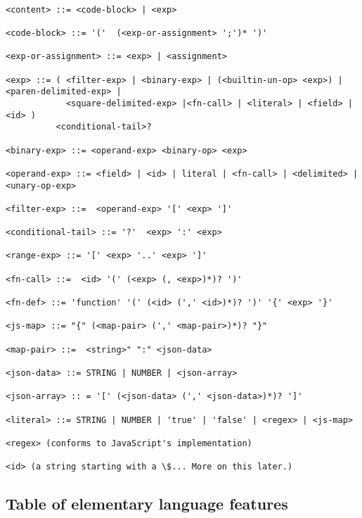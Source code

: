 \documentclass[9pt,letterpaper]{article}
\begin{document}
\begin{Verbatim}[fontsize=\footnotesize]

<content> ::= <code-block> | <exp>

<code-block> ::= '('  (<exp-or-assignment> ';')* ')'

<exp-or-assignment> ::= <exp> | <assignment>

<exp> ::= ( <filter-exp> | <binary-exp> | (<builtin-un-op> <exp>) | <paren-delimited-exp> |
            <square-delimited-exp> |<fn-call> | <literal> | <field> | <id> )
          <conditional-tail>?

<binary-exp> ::= <operand-exp> <binary-op> <exp>

<operand-exp> ::= <field> | <id> | literal | <fn-call> | <delimited> | <unary-op-exp>

<filter-exp> ::=  <operand-exp> '[' <exp> ']'

<conditional-tail> ::= '?'  <exp> ':' <exp>

<range-exp> ::= '[' <exp> '..' <exp> ']'

<fn-call> ::=  <id> '(' (<exp> (, <exp>)*)? ')'

<fn-def> ::= 'function' '(' (<id> (',' <id>)*)? ')' '{' <exp> '}'

<js-map> ::= "{" (<map-pair> (',' <map-pair>)*)? "}"

<map-pair> ::=  <string>" ":" <json-data>

<json-data> ::= STRING | NUMBER | <json-array>

<json-array> :: = '[' (<json-data> (',' <json-data>)*)? ']'

<literal> ::= STRING | NUMBER | 'true' | 'false' | <regex> | <js-map>

<regex> (conforms to JavaScript's implementation)

<id> (a string starting with a \$... More on this later.)

\end{Verbatim}

\subsection{Table of elementary language features}
\end{document}
